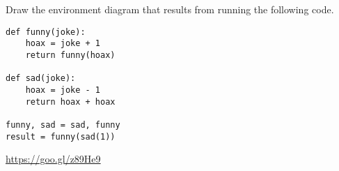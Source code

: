 \question Draw the environment diagram that results from running the following code.

\begin{lstlisting}
def funny(joke):
    hoax = joke + 1
    return funny(hoax)

def sad(joke):
    hoax = joke - 1
    return hoax + hoax

funny, sad = sad, funny
result = funny(sad(1))
\end{lstlisting}

\begin{solution}[2in]
\url{https://goo.gl/z89He9}
\end{solution}